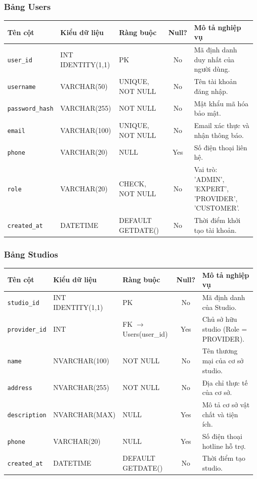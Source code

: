\setlength{\tabcolsep}{4pt}
\renewcommand{\arraystretch}{0.95}

\subsubsection{Bảng Users}
\begin{table}[H]
\centering
\small
\begin{tabularx}{\textwidth}{l l l c X}
\toprule
\textbf{Tên cột} & \textbf{Kiểu dữ liệu} & \textbf{Ràng buộc} & \textbf{Null?} & \textbf{Mô tả nghiệp vụ} \\
\midrule
\texttt{user\_id} & INT IDENTITY(1,1) & PK & No & Mã định danh duy nhất của người dùng. \\
\texttt{username} & VARCHAR(50) & UNIQUE, NOT NULL & No & Tên tài khoản đăng nhập. \\
\texttt{password\_hash} & VARCHAR(255) & NOT NULL & No & Mật khẩu mã hóa bảo mật. \\
\texttt{email} & VARCHAR(100) & UNIQUE, NOT NULL & No & Email xác thực và nhận thông báo. \\
\texttt{phone} & VARCHAR(20) & NULL & Yes & Số điện thoại liên hệ. \\
\texttt{role} & VARCHAR(20) & CHECK, NOT NULL & No & Vai trò: 'ADMIN', 'EXPERT', 'PROVIDER', 'CUSTOMER'. \\
\texttt{created\_at} & DATETIME & DEFAULT GETDATE() & No & Thời điểm khởi tạo tài khoản. \\
\bottomrule
\end{tabularx}
\end{table}

\subsubsection{Bảng Studios}
\begin{table}[H]
\centering
\small
\begin{tabularx}{\textwidth}{l l l c X}
\toprule
\textbf{Tên cột} & \textbf{Kiểu dữ liệu} & \textbf{Ràng buộc} & \textbf{Null?} & \textbf{Mô tả nghiệp vụ} \\
\midrule
\texttt{studio\_id} & INT IDENTITY(1,1) & PK & No & Mã định danh của Studio. \\
\texttt{provider\_id} & INT & FK $\rightarrow$ Users(user\_id) & Yes & Chủ sở hữu studio (Role = PROVIDER). \\
\texttt{name} & NVARCHAR(100) & NOT NULL & No & Tên thương mại của cơ sở studio. \\
\texttt{address} & NVARCHAR(255) & NOT NULL & No & Địa chỉ thực tế của cơ sở. \\
\texttt{description} & NVARCHAR(MAX) & NULL & Yes & Mô tả cơ sở vật chất và tiện ích. \\
\texttt{phone} & VARCHAR(20) & NULL & Yes & Số điện thoại hotline hỗ trợ. \\
\texttt{created\_at} & DATETIME & DEFAULT GETDATE() & No & Thời điểm tạo studio. \\
\bottomrule
\end{tabularx}
\end{table}

